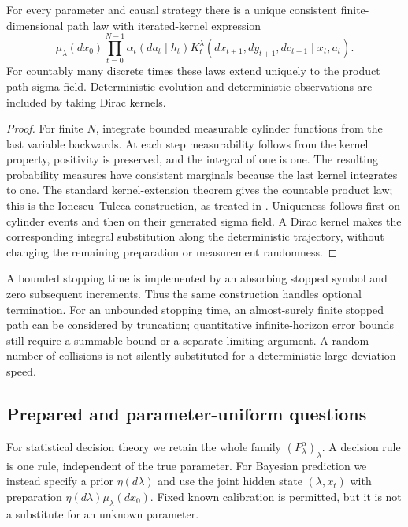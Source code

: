 \begin{proposition}\label{prop:paths}
For every parameter and causal strategy there is a unique consistent
finite-dimensional path law with iterated-kernel expression
\begin{equation}\label{eq:path-law}
 \mu_\lambda(dx_0)\prod_{t=0}^{N-1}
 \alpha_t(da_t\mid h_t)
 K_t^\lambda(dx_{t+1},dy_{t+1},dc_{t+1}\mid x_t,a_t).
\end{equation}
For countably many discrete times these laws extend uniquely to the product
path sigma field. Deterministic evolution and deterministic observations
are included by taking Dirac kernels.
\end{proposition}
\begin{proof}
For finite $N$, integrate bounded measurable cylinder functions from the
last variable backwards. At each step measurability follows from the kernel
property, positivity is preserved, and the integral of one is one. The
resulting probability measures have consistent marginals because the last
kernel integrates to one. The standard kernel-extension theorem gives the
countable product law; this is the Ionescu--Tulcea construction, as treated
in \cite{Kallenberg2021}. Uniqueness follows first on cylinder events and
then on their generated sigma field. A Dirac kernel makes the corresponding
integral substitution along the deterministic trajectory, without changing
the remaining preparation or measurement randomness.
\end{proof}

A bounded stopping time is implemented by an absorbing stopped symbol and
zero subsequent increments. Thus the same construction handles optional
termination. For an unbounded stopping time, an almost-surely finite stopped
path can be considered by truncation; quantitative infinite-horizon error
bounds still require a summable bound or a separate limiting argument.
A random number of collisions is not silently substituted for a
deterministic large-deviation speed.

\subsection{Prepared and parameter-uniform questions}
For statistical decision theory we retain the whole family
$(P_\lambda^\alpha)_\lambda$. A decision rule is one rule, independent of
the true parameter. For Bayesian prediction we instead specify a prior
$\eta(d\lambda)$ and use the joint hidden state $(\lambda,x_t)$ with
preparation $\eta(d\lambda)\mu_\lambda(dx_0)$. Fixed known calibration is
permitted, but it is not a substitute for an unknown parameter.

